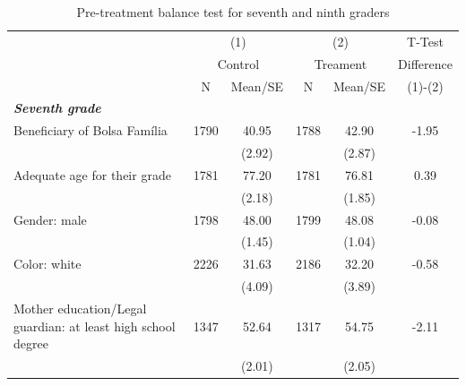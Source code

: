 \documentclass[
	article,			%
	12pt,				%
	oneside,			%
	a4paper,			%
	]{article}
\begin{document}
\begin{table}[h!]
  \centering
  \begin{threeparttable}
  \fontsize{9}{10}\selectfont
  \caption{Pre-treatment balance test for seventh and ninth graders}\label{tab:balance_adm2}
\begin{tabular*}{\textwidth}{@{\extracolsep{\fill}}lccccc@{}}
\toprule
           & \multicolumn{ 2}{c}{(1)} & \multicolumn{ 2}{c}{(2)} &     T-Test \\

           & \multicolumn{ 2}{c}{Control} & \multicolumn{ 2}{c}{Treament} & Difference \\

           &          N &    Mean/SE &          N &    Mean/SE &    (1)-(2) \\
\midrule
{\it {\bf Seventh grade}} &            &            &            &            &            \\

Beneficiary of Bolsa Família &       1790 &      40.95 &       1788 &      42.90 &      -1.95 \\

           &            &     (2.92) &            &     (2.87) &            \\

Adequate age for their grade &       1781 &      77.20 &       1781 &      76.81 &       0.39 \\

           &            &     (2.18) &            &     (1.85) &            \\

Gender: male &       1798 &      48.00 &       1799 &      48.08 &      -0.08 \\

           &            &     (1.45) &            &     (1.04) &            \\

Color: white &       2226 &      31.63 &       2186 &      32.20 &      -0.58 \\

           &            &     (4.09) &            &     (3.89) &            \\

Mother education/Legal guardian: at least high school degree &       1347 &      52.64 &       1317 &      54.75 &      -2.11 \\

           &            &     (2.01) &            &     (2.05) &            \\


\end{tabular*}
\end{threeparttable}
\end{table}
\end{document}
